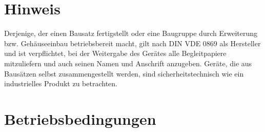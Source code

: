 \documentclass[fleqn,10pt]{SelfArx} %
\begin{document}
\flushbottom %

\maketitle %

\tableofcontents %

\thispagestyle{empty} %


\section*{Hinweis} %


Derjenige, der einen Bausatz fertigstellt oder eine Baugruppe durch Erweiterung bzw. Gehäuseeinbau betriebsbereit macht, gilt nach DIN VDE 0869 als Hersteller und ist verpflichtet, bei der Weitergabe des Gerätes alle Begleitpapiere mitzuliefern und auch seinen Namen und Anschrift anzugeben. Geräte, die aus Bausätzen selbst zusammengestellt werden, sind sicherheitstechnisch wie ein industrielles Produkt zu betrachten.


\section{Betriebsbedingungen}
\end{document}
